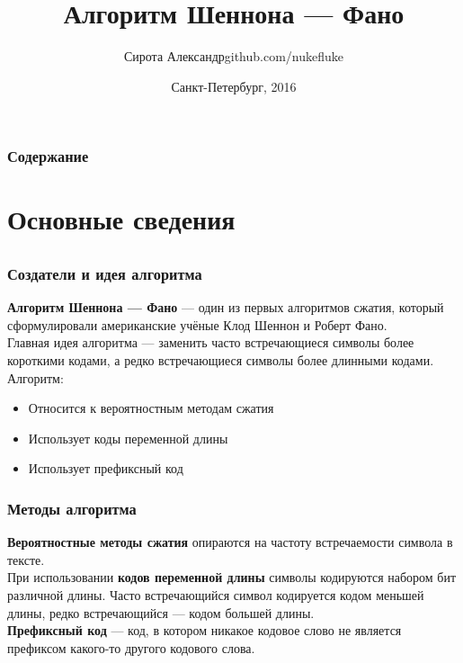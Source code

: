 \documentclass[10pt,pdf,hyperref={unicode}]{beamer}
\title{Алгоритм Шеннона --- Фано}
\author{Сирота Александр\newline\scriptsize github.com/nukefluke}
\institute{\normalsize{ГУАП} \\ \scriptsize{5 факультет \\ Группа 5511}}
\date[3pt]{\scriptsize{Санкт-Петербург, 2016}}
\begin{document}
\maketitle

\begin{frame}[t]\frametitle{Содержание}
	\tableofcontents
\end{frame}

\section{Основные сведения}
\subsection{}

	\begin{frame}[t]\frametitle{Создатели и идея алгоритма}
		\textbf{Алгоритм Шеннона --- Фано} --- один из первых алгоритмов 
		сжатия, который сформулировали американские учёные Клод Шеннон и Роберт 
		Фано.\\
		\vspace{1em}
		Главная идея алгоритма --- заменить часто встречающиеся символы более короткими кодами, а редко встречающиеся символы более длинными кодами.\\
		\vspace{1em}
		Алгоритм:
		\begin{itemize}
			\item Относится к вероятностным методам сжатия
			\item Использует коды переменной длины
			\item Использует префиксный код
		\end{itemize}
	\end{frame}

	\begin{frame}\frametitle{Методы алгоритма}
		\textbf{Вероятностные методы сжатия} опираются на частоту встречаемости символа в тексте.\\
		\vspace{1em}
		При использовании \textbf{кодов переменной длины} символы кодируются 
		набором бит различной длины.
		Часто встречающийся символ кодируется кодом меньшей длины, 
		редко встречающийся --- кодом большей длины.\\
		\vspace{1em}
		\textbf{Префиксный код} --- код, в котором 
		никакое кодовое слово не является префиксом какого-то другого кодового слова.
	\end{frame}
\end{document}

